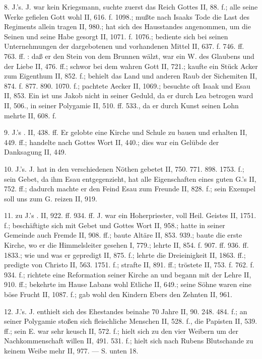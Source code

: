 8.  J.’s. J. war kein Kriegsmann, suchte zuerst das Reich Gottes II, 88. f.; alle seine Werke gefielen Gott wohl II, 616. f. 1098.; mußte nach Isaaks Tode die Last des Regiments allein tragen II, 980.; hat sich des Hausstandes angenommen, um die Seinen und seine Habe gesorgt II, 1071. f. 1076.; bediente sich bei seinen Unternehmungen der dargebotenen und vorhandenen Mittel II, 637. f. 746. ff. 763. ff. : daß er den Stein von dem Brunnen wälzt, war ein W. des Glaubens und der Liebe II, 476. ff.; schwor bei dem wahren Gott II, 721.; kaufte ein Stück Acker zum Eigenthum II, 852. f.; behielt das Land und anderen Raub der Sichemiten II, 874. f. 877. 890. 1070. f.; pachtete Aecker II, 1069.; besuchte oft Isaak und Esau II, 853. Ein  ist uns Jakob nicht in seiner Geduld, da er durch Lea betrogen ward II, 506., in seiner Polygamie II, 510. ff. 533., da er durch Kunst seinen Lohn mehrte II, 608. f.

9. J.’s . II, 438. ff. Er gelobte eine Kirche und Schule zu bauen und erhalten II, 449. ff.; handelte nach Gottes Wort II, 440.; dies war ein Gelübde der Danksagung II, 449.

10.  J.’s. J. hat in den verschiedenen Nöthen gebetet II, 750. 771. 898. 1753. f.; sein Gebet, da ihm Esau entgegenzieht, hat alle Eigenschaften eines guten G.’s II, 752. ff.; dadurch machte er den Feind Esau zum Freunde II, 828. f.; sein Exempel soll uns zum G. reizen II, 919.

11.  zu J.’s . II, 922. ff. 934. ff. J. war ein Hoherpriester, voll Heil. Geistes II, 1751. f.; beschäftigte sich mit Gebet und Gottes Wort II, 958.; hatte in seiner Gemeinde auch Fremde II, 908. ff.; baute Altäre II, 853. 939.; baute die erste Kirche, wo er die Himmelsleiter gesehen I, 779.; lehrte II, 854. f. 907. ff. 936. ff. 1833.; wie und was er gepredigt II, 875. f.; lehrte die Dreieinigkeit II, 1863. ff.; predigte von Christo II, 563. 1751. f.; strafte II, 891. ff.; tröstete II, 753. f. 762. f. 934. f.; richtete eine Reformation seiner Kirche an und begann mit der Lehre II, 910. ff.; bekehrte im Hause Labans wohl Etliche II, 649.; seine Söhne waren eine böse Frucht II, 1087. f.; gab wohl den Kindern Ebers den Zehnten II, 961.

12.  J.’s. J. enthielt sich des Ehestandes beinahe 70 Jahre II, 90. 248. 484. f.; an seiner Polygamie stoßen sich fleischliche Menschen II, 528. f., die Papisten II, 539. ff.; sein E. war sehr keusch II, 572. f.; hielt sich zu den vier Weibern um der Nachkommenschaft willen II, 491. 531. f.; hielt sich nach Rubens Blutschande zu keinem Weibe mehr II, 977. — S. unten 18.

